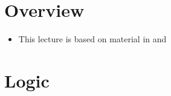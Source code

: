\documentclass[11pt,twoside]{report}
\begin{document}



\section*{Overview} 

\begin{itemize}


\item This lecture is based on material in  \cite[Chapter~1]{chamberland:2023EF} and \cite[Parts~I--II]{bloch:2011}


\end{itemize}

\section{Logic} 

\end{document}
